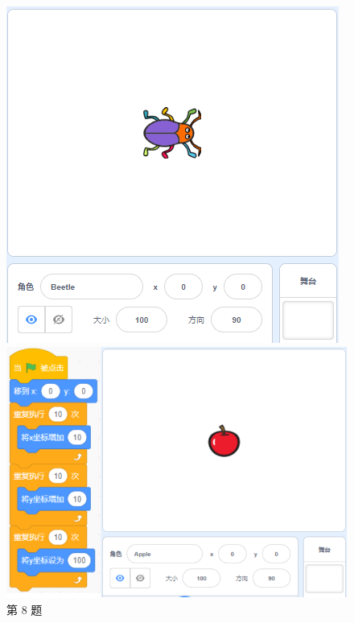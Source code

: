 \documentclass[10pt, a4paper]{article}
\begin{document}
\begin{enumerate}
\begin{figure}[htbp]
\begin{minipage}[t]{.4\textwidth}
\begin{minipage}[t]{.4\textwidth}
                \end{minipage}
                \begin{minipage}[t]{.5\textwidth}
                    \centering
                    \includegraphics[width=\textwidth]{8-2.png}
                \end{minipage}
                \caption*{第 8 题}
            \end{minipage}
            \begin{minipage}[t]{.28\textwidth}
                \centering
                \includegraphics[width=\textwidth]{9.png}

\end{minipage}
\end{figure}
\end{enumerate}
\end{document}
